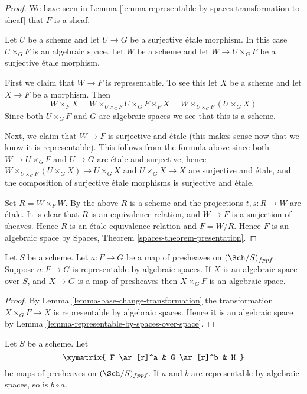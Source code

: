 \begin{proof}
We have seen in
Lemma \ref{lemma-representable-by-spaces-transformation-to-sheaf}
that $F$ is a sheaf.

\medskip\noindent
Let $U$ be a scheme and let $U \to G$ be a surjective \'etale morphism.
In this case $U \times_G F$ is an algebraic space. Let $W$ be a scheme
and let $W \to U \times_G F$ be a surjective \'etale morphism.

\medskip\noindent
First we claim that $W \to F$ is representable.
To see this let $X$ be a scheme and let $X \to F$ be a morphism.
Then
$$
W \times_F X = W \times_{U \times_G F} U \times_G F \times_F X
= W \times_{U \times_G F} (U \times_G X)
$$
Since both $U \times_G F$ and $G$ are algebraic spaces we see that
this is a scheme.

\medskip\noindent
Next, we claim that $W \to F$ is surjective and \'etale (this makes
sense now that we know it is representable). This follows from the
formula above since both $W \to U \times_G F$ and $U \to G$
are \'etale and surjective, hence
$W \times_{U \times_G F} (U \times_G X) \to U \times_G X$ and
$U \times_G X \to X$ are surjective and \'etale, and the composition of
surjective \'etale morphisms is surjective and \'etale.

\medskip\noindent
Set $R = W \times_F W$. By the above $R$ is a scheme and
the projections $t, s : R \to W$
are \'etale. It is clear that $R$ is an equivalence relation, and
$W \to F$ is a surjection of sheaves. Hence $R$ is an \'etale equivalence
relation and $F = W/R$. Hence $F$ is an algebraic space by
Spaces,
Theorem \ref{spaces-theorem-presentation}.
\end{proof}


\begin{lemma}
\label{lemma-representable-by-spaces}
Let $S$ be a scheme.
Let $a : F \to G$ be a map of presheaves on $(\Sch/S)_{fppf}$.
Suppose $a : F \to G$ is representable by algebraic spaces.
If $X$ is an algebraic space over $S$, and $X \to G$ is a map of presheaves
then $X \times_G F$ is an algebraic space.
\end{lemma}

\begin{proof}
By Lemma \ref{lemma-base-change-transformation} the transformation
$X \times_G F \to X$ is representable by algebraic spaces. Hence it is
an algebraic space by
Lemma \ref{lemma-representable-by-spaces-over-space}.
\end{proof}

\begin{lemma}
\label{lemma-composition-transformation}
Let $S$ be a scheme.
Let
$$
\xymatrix{
F \ar[r]^a & G \ar[r]^b & H
}
$$
be maps of presheaves on $(\Sch/S)_{fppf}$.
If $a$ and $b$ are representable by algebraic spaces, so is
$b \circ a$.
\end{lemma}

